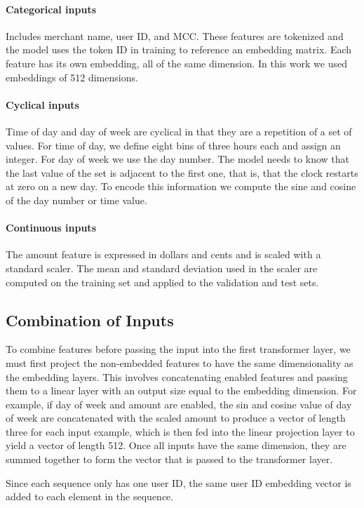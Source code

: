 \documentclass{article}
\begin{document}
\paragraph{Categorical inputs}	 Includes merchant name, user ID, and MCC. These features are tokenized and the model uses the token ID in training to reference an embedding matrix. Each feature has its own embedding, all of the same dimension. In this work we used embeddings of 512 dimensions.

\paragraph{Cyclical inputs} Time of day and day of week are cyclical in that they are a repetition of a set of values. For time of day, we define eight bins of three hours each and assign an integer. For day of week we use the day number. The model needs to know that the last value of the set is adjacent to the first one, that is, that the clock restarts at zero on a new day. To encode this information we compute the sine and cosine of the day number or time value. 

\paragraph{Continuous inputs} The amount feature is expressed in dollars and cents and is scaled with a standard scaler. The mean and standard deviation used in the scaler are computed on the training set and applied to the validation and test sets.

\subsection{Combination of Inputs}
To combine features before passing the input into the first transformer layer, we must first project the non-embedded features to have the same dimensionality as the embedding layers. This involves concatenating enabled features and passing them to a linear layer with an output size equal to the embedding dimension. For example, if day of week and amount are enabled, the sin and cosine value of day of week are concatenated with the scaled amount to produce a vector of length three for each input example, which is then fed into the linear projection layer to yield a vector of length 512. Once all inputs have the same dimension, they are summed together to form the vector that is passed to the transformer layer. 

Since each sequence only has one user ID, the same user ID embedding vector is added to each element in the sequence. 
\end{document}
